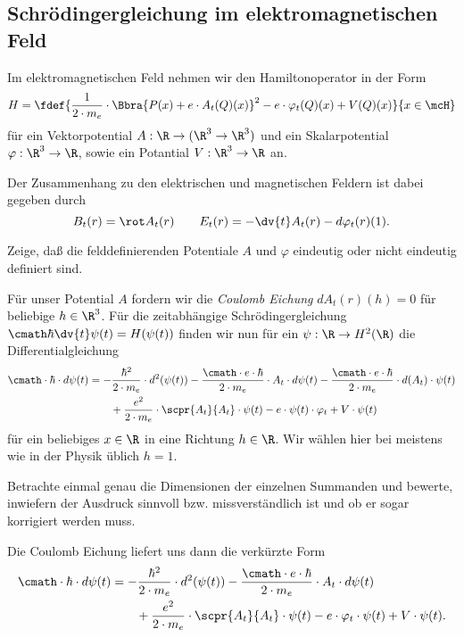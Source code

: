 \documentclass{subfile}
\begin{document}
    \subsection{Schrödingergleichung im elektromagnetischen Feld}
        Im elektromagnetischen Feld nehmen wir den Hamiltonoperator in der Form
        \[
            H = \fdef{
                \frac{1}{2\cdot m_e}\cdot\Bbra{
                    P(x) + e\cdot A_t(Q)(x)
                }^2 - e\cdot\varphi_t(Q)(x) + V(Q)(x)
            }{x\in\mcH}
        \]
        für ein Vektorpotential $A:\R\to(\R^3\to\R^3)$ und ein Skalarpotential $\varphi:\R^3\to\R$, sowie ein Potantial $V:\R^3\to\R$ an. 

        Der Zusammenhang zu den elektrischen und magnetischen Feldern ist dabei gegeben durch
        \[
            B_t(r) = \rot A_t(r)\qquad E_t(r) = -\dv{t}A_t(r) - d\varphi_t(r)(1).
        \]
        \begin{Aufgabe}
            \nr{} Zeige, daß die felddefinierenden Potentiale $A$ und $\varphi$ eindeutig oder nicht eindeutig definiert sind. 
        \end{Aufgabe}
        Für unser Potential $A$ fordern wir die \emph{Coulomb Eichung} $dA_t(r)(h) = 0$ für beliebige $h\in\R^3$. Für die zeitabhängige Schrödingergleichung $\cmath\hbar\dv{t}\psi(t) = H(\psi(t))$ finden wir nun für ein $\psi:\R\to H^2(\R)$ die Differentialgleichung
        \begin{align*}
            \cmath\cdot\hbar\cdot d{\psi(t)} &= -\frac{\hbar^2}{2\cdot m_e}\cdot d^2(\psi(t)) - \frac{\cmath\cdot e\cdot\hbar}{2\cdot m_e}\cdot A_t\cdot d\psi(t) - \frac{\cmath\cdot e\cdot\hbar}{2\cdot m_e}\cdot d(A_t)\cdot\psi(t) \\
            &\qquad + \frac{e^2}{2\cdot m_e}\cdot \scpr{A_t}{A_t}\cdot\psi(t) - e\cdot\psi(t)\cdot\varphi_t + V\cdot\psi(t)
        \end{align*}
        für ein beliebiges $x\in\R$ in eine Richtung $h\in\R$. Wir wählen hier bei meistens wie in der Physik üblich $h = 1$. 
        \begin{Aufgabe}
            \nr{} Betrachte einmal genau die Dimensionen der einzelnen Summanden und bewerte, inwiefern der Ausdruck sinnvoll bzw. missverständlich ist und ob er sogar korrigiert werden muss.
        \end{Aufgabe}
        \indent Die Coulomb Eichung liefert uns dann die verkürzte Form
        \begin{align*}
            \cmath\cdot\hbar\cdot d{\psi(t)} &= -\frac{\hbar^2}{2\cdot m_e}\cdot d^2(\psi(t)) - \frac{\cmath\cdot e\cdot\hbar}{2\cdot m_e}\cdot A_t\cdot d\psi(t) \\
            &\qquad+ \frac{e^2}{2\cdot m_e}\cdot\scpr{A_t}{A_t}\cdot\psi(t) - e\cdot\varphi_t\cdot\psi(t) + V\cdot\psi(t).
        \end{align*}
\end{document}
